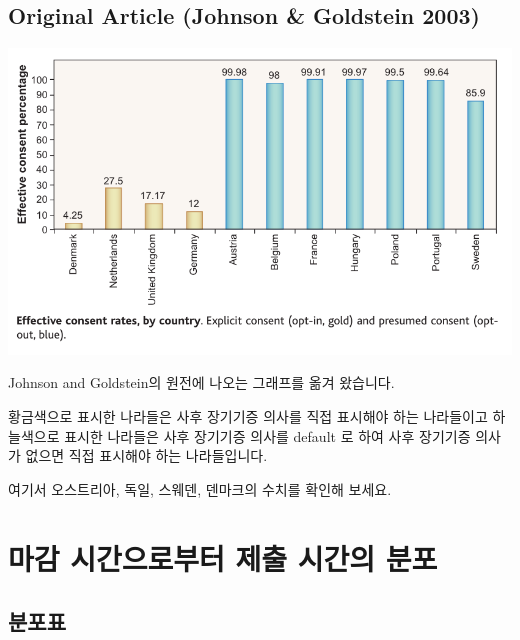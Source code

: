 \documentclass[
]{book}
\begin{document}
\subsection{Original Article (Johnson \& Goldstein 2003)}\label{original-article-johnson-goldstein-2003}

\begin{flushleft}\includegraphics[width=0.5\linewidth]{./pics/default_effects_by_country} \end{flushleft}

Johnson and Goldstein의 원전에 나오는 그래프를 옮겨 왔습니다.

황금색으로 표시한 나라들은 사후 장기기증 의사를 직접 표시해야 하는 나라들이고 하늘색으로 표시한 나라들은 사후 장기기증 의사를 default 로 하여 사후 장기기증 의사가 없으면 직접 표시해야 하는 나라들입니다.

여기서 오스트리아, 독일, 스웨덴, 덴마크의 수치를 확인해 보세요.

\section{마감 시간으로부터 제출 시간의 분포}\label{uxb9c8uxac10-uxc2dcuxac04uxc73cuxb85cuxbd80uxd130-uxc81cuxcd9c-uxc2dcuxac04uxc758-uxbd84uxd3ec-9}

\subsection{분포표}\label{uxbd84uxd3ecuxd45c-10}
\end{document}
